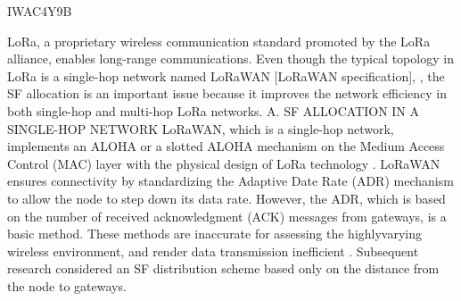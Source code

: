 
\cite{zhu_improving_2019} IWAC4Y9B

LoRa,
	a proprietary wireless communication standard promoted by the LoRa alliance,
	enables long-range communications.
Even though the typical topology in LoRa is a single-hop network named LoRaWAN [LoRaWAN specification],
	\cite{pop_does_2017},
	the SF allocation is an important issue because it improves the network efficiency in both single-hop and multi-hop LoRa networks.
A.
SF ALLOCATION IN A SINGLE-HOP NETWORK LoRaWAN,
	which is a single-hop network,
	implements an ALOHA or a slotted ALOHA mechanism on the Medium Access Control (MAC) layer with the physical design of LoRa technology \cite{mahmood_scalability_2019}.
LoRaWAN ensures connectivity by standardizing the Adaptive Date Rate (ADR) mechanism to allow the node to step down its data rate.
However,
	the ADR,
	which is based on the number of received acknowledgment (ACK) messages from gateways,
	is a basic method.
These methods are inaccurate for assessing the highlyvarying wireless environment,
	and render data transmission inefficient \cite{kim_adaptive_2017}.
Subsequent research  \cite{adelantado_understanding_2017}
\cite{reynders_power_2017}
\cite{reynders_improving_2018}
\cite{slabicki_adaptive_2018}
considered an SF distribution scheme based only on the distance from the node to gateways.








